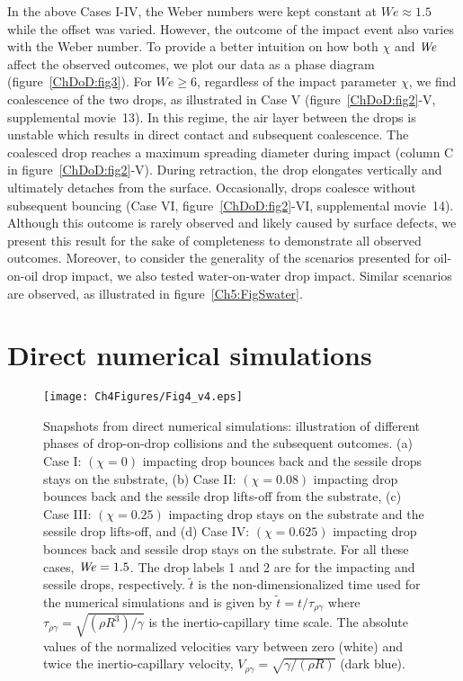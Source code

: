 In the above Cases I-IV, the Weber numbers were kept constant at $We \approx 1.5$ while the offset was varied. However, the outcome of the impact event also varies with the Weber number. To provide a better intuition on how both $\chi$ and $\mathit{We}$ affect the observed outcomes, we plot our data as a phase diagram (figure~\ref{ChDoD:fig3}). For $We \geq 6$, regardless of the impact parameter $\chi$, we find coalescence of the two drops, as illustrated in Case V (figure~\ref{ChDoD:fig2}-V, supplemental movie~{\color{Myfig}13}). In this regime, the air layer between the drops is unstable which results in direct contact and subsequent coalescence. The coalesced drop reaches a maximum spreading diameter during impact (column C in figure~\ref{ChDoD:fig2}-V). During retraction, the drop elongates vertically and ultimately detaches from the surface. Occasionally, drops coalesce without subsequent bouncing (Case VI, figure~\ref{ChDoD:fig2}-VI, supplemental movie~{\color{Myfig}14}). Although this outcome is rarely observed and likely caused by surface defects, we present this result for the sake of completeness to demonstrate all observed outcomes. Moreover, to consider the generality of the scenarios presented for oil-on-oil drop impact, we also tested water-on-water drop impact. Similar scenarios are observed, as illustrated in figure~\ref{Ch5:FigSwater}.

\section{Direct numerical simulations}\label{Ch5:DNS}

\begin{figure}
	\centering
	\texttt{[image: Ch4Figures/Fig4\_v4.eps]}
	\caption{Snapshots from direct numerical simulations: illustration of different phases of drop-on-drop collisions and the subsequent outcomes. (a) Case I: $\left(\chi=0\right)$ impacting drop bounces back and the sessile drops stays on the substrate, (b) Case II: $\left(\chi=0.08\right)$ impacting drop bounces back and the sessile drop lifts-off from the substrate, (c) Case III: $\left(\chi=0.25\right)$ impacting drop stays on the substrate and the sessile drop lifts-off, and (d) Case IV: $\left(\chi=0.625\right)$ impacting drop bounces back and sessile drop stays on the substrate. For all these cases, $\mathit{We} = 1.5$. The drop labels 1 and 2 are for the impacting and sessile drops, respectively. $\tilde{t}$ is the non-dimensionalized time used for the numerical simulations and is given by $\tilde{t} = t/\tau_{\rho\gamma}$ where $\tau_{\rho\gamma} = \sqrt{\left(\rho R^3\right)/\gamma}$ is the inertio-capillary time scale. The absolute values of the normalized velocities vary between zero (white) and twice the inertio-capillary velocity, $V_{\rho\gamma}=\sqrt{\gamma/\left(\rho R\right)}$ (dark blue).}
	\label{ChDoD:fig4}
\end{figure}

